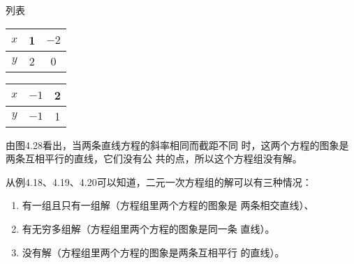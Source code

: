 \begin{solution}
    列表
    \begin{multicols}{2}
       \begin{center}
           \begin{tabular}{c|cc}
              \hline
               $x$&1&$-2$\\
               \hline
               $y$&2&0\\
               \hline
           \end{tabular}
       \end{center}
       \begin{center}
           \begin{tabular}{c|cc}
               \hline
               $x$&$-1$&2\\
               \hline
               $y$&$-1$&1\\
               \hline
           \end{tabular}
       \end{center}
   \end{multicols}
   \begin{figure}[htp]
    \centering
{}
    \caption{}
\end{figure}

由图4.28看出，当两条直线方程的斜率相同而截距不同
时，这两个方程的图象是两条互相平行的直线，它们没有公
共的点，所以这个方程组没有解。
\end{solution}


从例4.18、4.19、4.20可以知道，二元一次方程组的解可以有三种情况：
\begin{enumerate}
   \item 有一组且只有一组解（方程组里两个方程的图象是
两条相交直线）、
\item 有无穷多组解（方程组里两个方程的图象是同一条
直线）。
\item 没有解（方程组里两个方程的图象是两条互相平行
的直线）。 
\end{enumerate}


